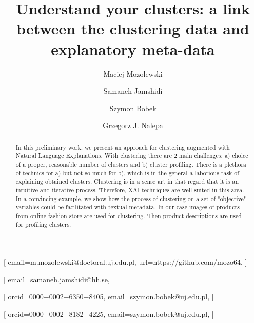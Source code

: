 \documentclass[
 twocolumn,
]{ceurart}
\begin{document}


\title{Understand your clusters: a link between the clustering data and explanatory meta-data}

\tnotemark[1]

\author[1]{Maciej Mozolewski}[%
email=m.mozolewski@doctoral.uj.edu.pl,
url=https://github.com/mozo64,
]
\address[1]{Institute of Applied Computer Science, and Jagiellonian Human-Centered Artificial
Intelligence Laboratory (JAHCAI), Cracow, Poland}

\author[2]{Samaneh Jamshidi}[%
  email=samaneh.jamshidi@hh.se,
]
\address[2]{Center for Applied Intelligent Systems Research (CAISR), Halmstad University, Halmstad, Sweden}

\author[1]{Szymon Bobek}[%
orcid=0000−0002−6350−8405,
email=szymon.bobek@uj.edu.pl,
]

\author[1]{Grzegorz J. Nalepa}[%
orcid=0000−0002−8182−4225,
email=szymon.bobek@uj.edu.pl,
]


\begin{abstract}
  In this preliminary work, we present an approach for clustering augmented with Natural Language Explanations.
  With clustering there are 2 main challenges: a) choice of a proper, reasonable number of clusters and b) cluster profiling.
  There is a plethora of technics for a) but not so much for b), which is in the general a laborious task of explaining obtained clusters.
  Clustering is in a sense art in that regard that it is an intuitive and iterative process.
  Therefore, XAI techniques are well suited in this area.
  In a convincing example, we show how the process of clustering on a set of "objective" variables could be facilitated with textual metadata.
  In our case images of products from online fashion store are used for clustering.
  Then product descriptions are used for profiling clusters.
\end{abstract}
\end{document}
